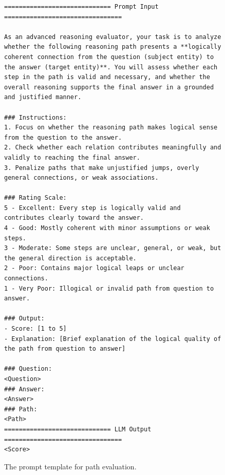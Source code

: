 \begin{figure}[htb]
    \centering
    \begin{minipage}{0.99\columnwidth}
        \centering
        \begin{tcolorbox}[title=Path Evaluation Prompt]
            \small
            \begin{lstlisting}
============================= Prompt Input ================================
    
As an advanced reasoning evaluator, your task is to analyze whether the following reasoning path presents a **logically coherent connection from the question (subject entity) to the answer (target entity)**. You will assess whether each step in the path is valid and necessary, and whether the overall reasoning supports the final answer in a grounded and justified manner.

### Instructions:
1. Focus on whether the reasoning path makes logical sense from the question to the answer.
2. Check whether each relation contributes meaningfully and validly to reaching the final answer.
3. Penalize paths that make unjustified jumps, overly general connections, or weak associations.

### Rating Scale:
5 - Excellent: Every step is logically valid and contributes clearly toward the answer.  
4 - Good: Mostly coherent with minor assumptions or weak steps.  
3 - Moderate: Some steps are unclear, general, or weak, but the general direction is acceptable.  
2 - Poor: Contains major logical leaps or unclear connections.  
1 - Very Poor: Illogical or invalid path from question to answer.

### Output:
- Score: [1 to 5]  
- Explanation: [Brief explanation of the logical quality of the path from question to answer]

### Question:
<Question>
### Answer:
<Answer>
### Path:
<Path>
============================= LLM Output ================================
<Score>
            \end{lstlisting}
        \end{tcolorbox}
        \vspace{1mm}
    \end{minipage}
    \caption{The prompt template for path evaluation.}
    \label{fig:path_eval_prompt}
\end{figure}